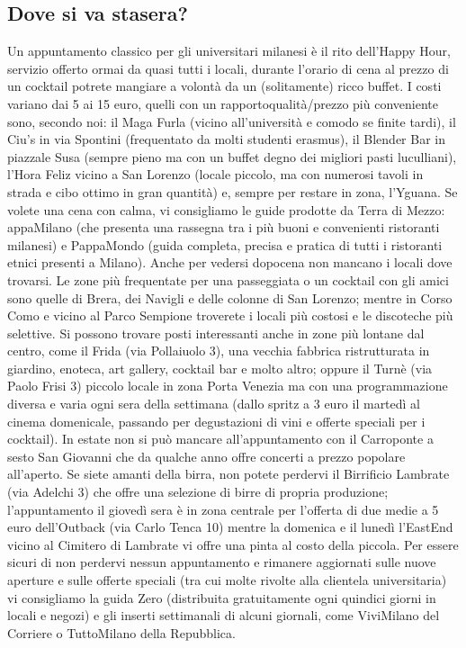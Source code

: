 \subsection{Dove si va stasera?}
Un appuntamento classico per gli universitari milanesi è il rito dell'Happy Hour,  servizio offerto ormai da quasi tutti i locali, durante l'orario di cena al prezzo di un cocktail potrete mangiare a volontà da un (solitamente) ricco buffet. I costi variano dai 5 ai 15 euro, quelli con un rapportoqualità/prezzo più conveniente sono, secondo noi: il Maga Furla (vicino all'università e comodo se finite tardi), il Ciu's in via Spontini (frequentato da molti studenti erasmus), il Blender Bar in piazzale Susa (sempre pieno ma con un buffet degno dei migliori pasti luculliani), l'Hora Feliz vicino a San Lorenzo (locale piccolo, ma con numerosi tavoli in strada e cibo ottimo in gran quantità) e, sempre per restare in zona, l'Yguana. Se volete una cena con calma, vi consigliamo le guide prodotte da Terra di Mezzo: appaMilano (che presenta una rassegna tra i più buoni e convenienti ristoranti milanesi) e PappaMondo (guida completa, precisa e pratica di tutti i ristoranti etnici presenti a Milano).
Anche per vedersi dopocena non mancano i locali dove trovarsi. Le zone più frequentate per una passeggiata o un cocktail con gli amici sono quelle di Brera, dei Navigli e delle colonne di San Lorenzo; mentre in Corso Como e vicino al Parco Sempione troverete i locali più costosi e le discoteche più selettive. Si possono trovare posti interessanti anche in zone più lontane dal centro, come il Frida (via Pollaiuolo 3), una vecchia fabbrica ristrutturata in giardino, enoteca, art gallery, cocktail bar e molto altro; oppure il Turnè (via Paolo Frisi 3) piccolo locale in zona Porta Venezia ma con una programmazione diversa e varia ogni sera della settimana (dallo spritz a 3 euro il martedì al cinema domenicale, passando per degustazioni di vini e offerte speciali per i cocktail). In estate non si può mancare all'appuntamento con il Carroponte a sesto San Giovanni che da qualche anno offre concerti a prezzo popolare all'aperto. 
Se siete amanti della birra, non potete perdervi il Birrificio Lambrate (via Adelchi 3) che offre una selezione di birre di propria produzione; l'appuntamento il giovedì sera è in zona centrale per l'offerta di due medie a 5 euro dell'Outback (via Carlo Tenca 10) mentre la domenica e il lunedì l'EastEnd vicino al Cimitero di Lambrate vi offre una pinta al costo della piccola. Per essere sicuri di non perdervi nessun appuntamento e rimanere aggiornati sulle nuove aperture e sulle offerte speciali (tra cui molte rivolte alla clientela universitaria) vi consigliamo la guida Zero (distribuita gratuitamente ogni quindici giorni in locali e negozi) e gli inserti settimanali di alcuni giornali, come ViviMilano del Corriere o TuttoMilano della Repubblica. 


